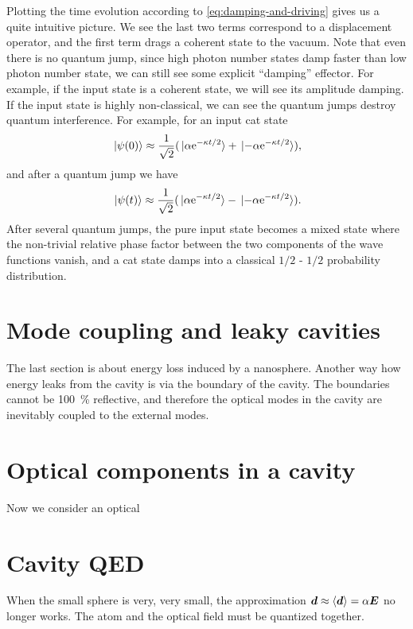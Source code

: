 \documentclass[hyperref, a4paper]{article}
\newcommand*{\ee}{\mathrm{e}}
\begin{document}
Plotting the time evolution according to \eqref{eq:damping-and-driving} gives us a quite intuitive picture.
We see the last two terms correspond to a displacement operator, and the first term drags a coherent state 
to the vacuum. Note that even there is no quantum jump, since high photon number states damp faster than 
low photon number state, we can still see some explicit ``damping'' effector. For example, if the input 
state is a coherent state, we will see its amplitude damping.
If the input state is highly non-classical, we can see the quantum jumps destroy quantum interference.
For example, for an input cat state 
\[
    \ket*{\psi(0)} \approx \frac{1}{\sqrt{2}} (\ket*{\alpha \ee^{- \kappa t / 2}} + \ket*{- \alpha \ee^{- \kappa t / 2}}),
\]
and after a quantum jump we have 
\[
    \ket*{\psi(t)} \approx \frac{1}{\sqrt{2}} (\ket*{\alpha \ee^{- \kappa t / 2}} - \ket*{- \alpha \ee^{- \kappa t / 2}}).
\]
After several quantum jumps, the pure input state becomes a mixed state where the non-trivial relative phase factor 
between the two components of the wave functions vanish, and a cat state damps into a classical $1/2$ - $1/2$ 
probability distribution.

\section{Mode coupling and leaky cavities}

The last section is about energy loss induced by a nanosphere. Another way how energy leaks from the cavity is 
via the boundary of the cavity. The boundaries cannot be \SI{100}{\percent} reflective, and therefore the 
optical modes in the cavity are inevitably coupled to the external modes.

\section{Optical components in a cavity}

Now we consider an optical 

\section{Cavity QED}

When the small sphere is very, very small, the approximation $\vb*{d} \approx \expval{\vb*{d}} = \alpha \vb*{E}$
no longer works. The atom and the optical field must be quantized together. 
\end{document}
